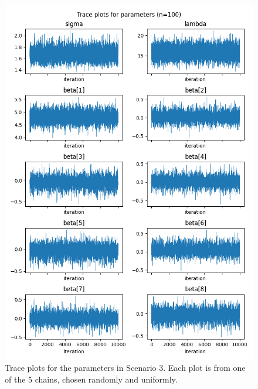 \documentclass[a4paper, 10pt]{article}
\begin{document}
\begin{figure}[htb]
\begin{center}
        \includegraphics[height=.4\textheight]{../outputs/artificial_scenarios_n=100/scenario_3/traceplots.png}
    \end{center}
    \caption[Trace plots for the parameters in Scenario 3.]{Trace plots for the parameters in Scenario 3. Each plot is from one of the 5 chains, chosen randomly and uniformly.}
    \label{fig: traceplots scenario 3}
\end{figure}
\end{document}
